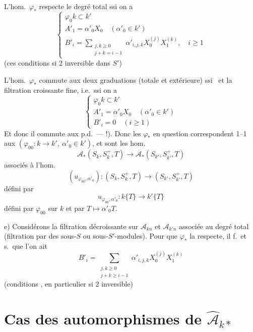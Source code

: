 \documentclass[11pt,a4paper]{article}
\begin{document}
L'hom.\ $\varphi_{*}$  respecte le degré total ssi on a
\[
\begin{cases}
\varphi_{0}k\subset k'\\
A'_{1}=\alpha'_{0}X_{0}\quad (\alpha'_{0}\in k')\\
B'_{i}=\sum\limits_{\substack{j,k\geq 0\\ j+k=i-1}}\alpha'_{i,j,k}X_{0}^{(j)}X_{1}^{(k)},\quad i\geq 1
\end{cases}
\]
(ces conditions  si $2$ inversible dans $S'$)

L'hom.\ $\varphi_{*}$ commute aux deux graduations (totale et extérieure)  ssi \struck{\ill{}} \ et la filtration croissante fine, i.e.\ ssi on a
\[
\begin{cases}
\varphi_{0}k\subset k'\\
A'_{1}=\alpha'_{0}X_{0}\quad (\alpha'_{0}\in k')\\
B'_{i}=0\quad (i\geq 1)
\end{cases}
\]
Et donc il commute aux p.d.\ —  !). Donc les $\varphi_{*}$ en question correspondent 1--1 aux   $(\varphi_{00}\colon k\to k',\ \alpha'_{0}\in k')$, et sont les hom.
\[
\mathcal{A}_{*}(S_{k},S_{k}^{+},T)\to\mathcal{A}_{*}(S_{k'},S_{k'}^{+},T)
\]
associés à l'hom.
\[
(u_{\varphi_{00},\alpha'_{0}})\colon (S_{k},S_{k}^{+},T)\to(S_{k'},S_{k'}^{+},T)
\]
défini par
\[
u_{\varphi_{00},\alpha'_{0}}\colon k\{T\}\to k'\{T\}
\]
défini par $\varphi_{00}$ sur $k$ et par $T\mapsto\alpha'_{0}T$.

e) Considérons la filtration décroissante sur $\mathcal{A}_{kn}$ et $\mathcal{A}_{k'n}$ associée au degré total (filtration par des sous-$S$ ou sous-$S'$-modules). Pour que $\varphi_{*}$ la respecte, il f.\ et s.\ que l'on ait
\[
B'_{i}=\sum_{\substack{j,k\geq 0\\ j+k\geq i-1}}\alpha'_{i,j,k}X_{0}^{(j)}X_{1}^{(k)}
\]
(conditions , en particulier si $2$ inversible)

\section{Cas des automorphismes de $\widehat{\mathcal{A}}_{k*}$}
\end{document}
